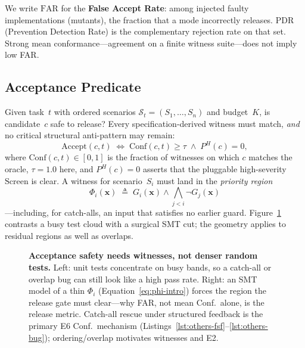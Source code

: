 We write $\mathrm{FAR}$ for the \textbf{False Accept Rate}: among injected
faulty implementations (mutants), the fraction that a mode incorrectly
releases.
$\mathrm{PDR}$ (Prevention Detection Rate) is the complementary rejection
rate on that set.
Strong mean conformance---agreement on a finite witness suite---does not
imply low FAR.

\subsection{Acceptance Predicate}
Given task~$t$ with ordered scenarios $\mathcal{S}_t = (S_1,\ldots,S_n)$ and
budget~$K$, is candidate~$c$ safe to release?
Every specification-derived witness must match, \emph{and} no critical
structural anti-pattern may remain:
\begin{equation}
  \mathrm{Accept}(c, t)
  \;\iff\;
  \mathrm{Conf}(c, t) \geq \tau
  \;\wedge\;
  P^H(c) = 0,
  \label{eq:acceptance}
\end{equation}
where $\mathrm{Conf}(c,t)\in[0,1]$ is the fraction of witnesses on which $c$
matches the oracle, $\tau=1.0$ here, and $P^H(c)=0$ asserts that the
pluggable high-severity $\mathrm{Screen}$ is clear.
A witness for scenario~$S_i$ must land in the \emph{priority region}
\begin{equation}
  \Phi_i(\mathbf{x})
  \;\triangleq\;
  G_i(\mathbf{x}) \wedge \bigwedge_{j<i}\neg G_j(\mathbf{x})
  \label{eq:phi-intro}
\end{equation}
---including, for catch-alls, an input that satisfies no earlier guard.
Figure~\ref{fig:defect-vs-test} contrasts a busy test cloud with a surgical
SMT cut; the geometry applies to residual regions as well as overlaps.

\begin{figure}[t]
  \centering
  \caption{\textbf{Acceptance safety needs witnesses, not denser random tests.}
    Left: unit tests concentrate on busy bands, so a catch-all or overlap bug
    can still look like a high pass rate.
    Right: an SMT model of a thin $\Phi_i$ (Equation~\eqref{eq:phi-intro})
    forces the region the release gate must clear---why FAR, not mean Conf.\
    alone, is the release metric.
    Catch-all rescue under structured feedback is the primary E6 Conf.\
    mechanism (Listings~\ref{lst:others-fsf}--\ref{lst:others-bug});
    ordering/overlap motivates witnesses and E2.}
  \label{fig:defect-vs-test}
\end{figure}

